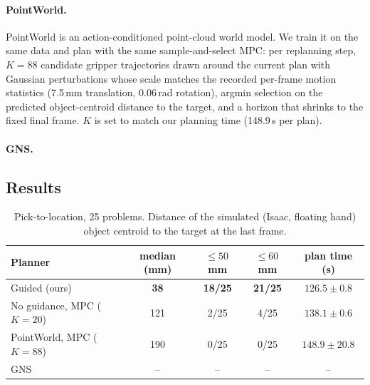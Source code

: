 \paragraph{PointWorld.}
PointWorld is an action-conditioned point-cloud world model. We train it on the same data and plan with the same
sample-and-select MPC: per replanning step, $K = 88$ candidate gripper trajectories drawn around the current plan
with Gaussian perturbations whose scale matches the recorded per-frame motion statistics (7.5\,mm translation,
0.06\,rad rotation), argmin selection on the predicted object-centroid distance to the target, and a horizon that
shrinks to the fixed final frame. $K$ is set to match our planning time (148.9\,s per plan).

\paragraph{GNS.}

\subsection{Results}
\label{sec:guidance-results}

\begin{table}[t]
\centering
\small
\caption{Pick-to-location, 25 problems. Distance of the simulated (Isaac, floating hand) object centroid to the target
at the last frame.}
\label{tab:pick-results}
\begin{tabular}{lcccc}
\toprule
Planner & median (mm) & $\le 50$\,mm & $\le 60$\,mm & plan time (s) \\
\midrule
Guided (ours) & \textbf{38} & \textbf{18/25} & \textbf{21/25} & $126.5 \pm 0.8$ \\
No guidance, MPC ($K = 20$) & 121 & 2/25 & 4/25 & $138.1 \pm 0.6$ \\
PointWorld, MPC ($K = 88$) & 190 & 0/25 & 0/25 & $148.9 \pm 20.8$ \\
GNS & -- & -- & -- & -- \\
\bottomrule
\end{tabular}
\end{table}

